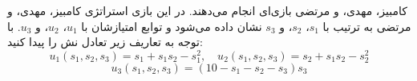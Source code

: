 کامبیز، مهدی، و مرتضی بازی‌ای انجام می‌دهند. در این بازی استراتژی کامبیز، مهدی، و مرتضی به ترتیب با
$s_1$،
$s_2$،
و
$s_3$
نشان داده می‌شود و توابع امتیازشان با
$u_1$،
$u_2$،
و
$u_3$.
با توجه به تعاریف زیر تعادل نش را پیدا کنید:
\[
u_1(s_1, s_2, s_3) = s_1 + s_1 s_2 - s_1^2, \quad u_2(s_1, s_2, s_3) = s_2 + s_1 s_2 - s_2^2
\]
\[
u_3(s_1, s_2, s_3) = (10 - s_1 - s_2 - s_3)s_3    
\]